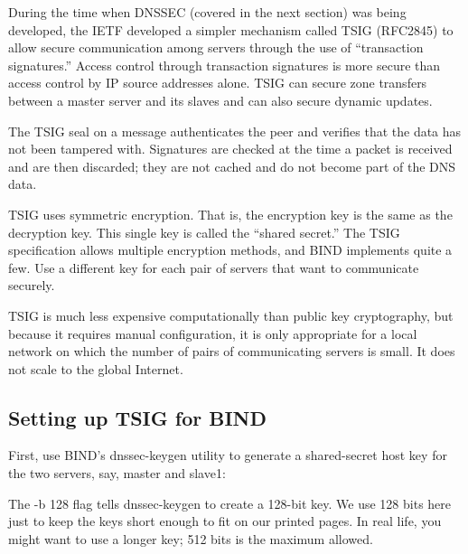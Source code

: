 \protect\hypertarget{part0024_split_057.htmlux5cux23_idIndexMarker2245}{}{}During
the time when DNSSEC (covered in the next section) was being developed,
the IETF developed a simpler mechanism called TSIG (RFC2845) to allow
secure communication among servers through the use of ``transaction
signatures.'' Access control through transaction signatures is more
secure than access control by IP source addresses alone. TSIG can secure
zone transfers between a master server and its slaves and can also
secure dynamic updates.

The TSIG seal on a message authenticates the peer and verifies that the
data has not been tampered with. Signatures are checked at the time a
packet is received and are then discarded; they are not cached and do
not become part of the DNS data.

TSIG uses symmetric encryption. That is, the encryption key is the same
as the decryption key. This single key is called the ``shared secret.''
The TSIG specification allows multiple encryption methods, and BIND
implements quite a few. Use a different key for each pair of servers
that want to communicate securely.

TSIG is much less expensive computationally than public key
cryptography, but because it requires manual configuration, it is only
appropriate for a local network on which the number of pairs of
communicating servers is small. It does not scale to the global
Internet.

\protect\hypertarget{part0024_split_058.html}{}{}

\hypertarget{part0024_split_058.htmlux5cux23_idContainer1069}{}
\hypertarget{part0024_split_058.htmlux5cux23calibre_pb_57}{%
\subsection[Setting up TSIG for
BIND]{\texorpdfstring{\protect\hypertarget{part0024_split_058.htmlux5cux23_idTextAnchor937}{}{}Setting
up TSIG for
BIND}{Setting up TSIG for BIND}}\label{part0024_split_058.htmlux5cux23calibre_pb_57}}

First, use BIND's {dnssec-keygen} utility to generate a shared-secret
host key for the two servers, say, master and slave1:


The {-b 128} flag tells
\protect\hypertarget{part0024_split_058.htmlux5cux23_idIndexMarker2246}{}{}{dnssec-keygen}
to create a 128-bit key. We use 128 bits here just to keep the keys
short enough to fit on our printed pages. In real life, you might want
to use a longer key; 512 bits is the maximum allowed.

